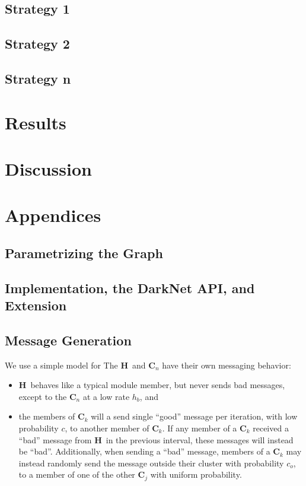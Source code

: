 \documentclass{article}
\newcommand{\Hub}[0]{\ensuremath{\mathbf{H}}}
\newcommand{\C}[1]{\ensuremath{\mathbf{C}_{#1}}}
\begin{document}
\subsection*{Strategy 1}

\subsection*{Strategy 2}

\subsection*{Strategy n}

\section*{Results}

\section*{Discussion}

\section*{Appendices}

\subsection*{Parametrizing the Graph}

\subsection*{Implementation, the DarkNet API, and Extension}


\subsection*{Message Generation}

We use a simple model for 
%
The \Hub\ and \C{n} have their own messaging behavior:
%
\begin{itemize}
\item \Hub\ behaves like a typical module member, but never sends bad messages, except to the \C{n} at a low rate $h_b$, and
\item the members of \C{k} will a send single ``good'' message per iteration, with low probability $c$, to another member of \C{k}.  If any member of a \C{k} received a ``bad'' message from \Hub\ in the previous interval, these messages will instead be ``bad''.  Additionally, when sending a ``bad'' message, members of a \C{k} may instead randomly send the message outside their cluster with probability $c_o$, to a member of one of the other \C{j} with uniform probability.
\end{itemize}
\end{document}
